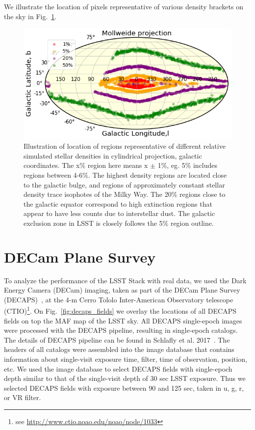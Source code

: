 \documentclass[DM,lsstdraft,toc,usenatbib]{lsstdoc}
\begin{document}
We illustrate the location of pixels representative of various density brackets on the sky in Fig.~\ref{fig:mollw_galactic}. 


\begin{figure}
\includegraphics[width=1.0\columnwidth]{figs/03_density_regions_mollw_galactic.png}
\caption{Illustration of location of regions representative of different relative simulated stellar densities in cylindrical projection, galactic coordinates. The x\% region  here means  x $\pm$ 1\%, eg.  5\% includes regions between 4-6\%. The highest density regions are located close to the galactic bulge, and regions of approximately constant stellar density trace isophotes of the Milky Way. The 20\% regions close to the galactic equator correspond to high extinction regions that appear to have less counts due to interstellar dust. The galactic exclusion zone in LSST is closely follows the 5\% region outline. }
\label{fig:mollw_galactic}
\end{figure} 


\section{DECam Plane Survey }
\label{sec:DECAPS}
To analyze the performance of the LSST Stack with real data, we used the Dark Energy Camera (DECam) imaging, taken as part of the  DECam Plane Survey (DECAPS)~\cite{schlafly2017}, at the 4-m Cerro Tololo Inter-American Observatory telescope (CTIO)\footnote{see \url{http://www.ctio.noao.edu/noao/node/1033}}. On Fig.~\ref{fig:decaps_fields} we overlay the locations of all DECAPS fields on top  the MAF map of the LSST sky. All DECAPS single-epoch images were processed with the DECAPS pipeline, resulting in single-epoch catalogs. The details of DECAPS pipeline can be found in Schlafly et al. 2017~\cite{schlafly2017}.  The headers of all catalogs were assembled into the image database that contains information about single-visit exposure time, filter,  time of observation, position, etc. We used the image database to select DECAPS fields with single-epoch depth similar to that of the single-visit depth of 30 sec LSST exposure. Thus we selected DECAPS fields with  exposure between 90  and 125 sec, taken in   u, g, r,  or VR filter. 
\end{document}

